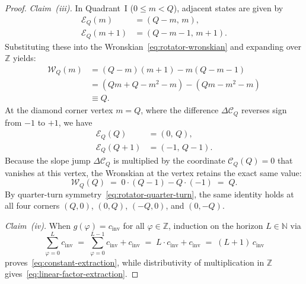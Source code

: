\documentclass[11pt,a4paper]{article}
\theoremstyle{plain}
\theoremstyle{definition}
\begin{document}
\begin{proof}
\emph{Claim~(iii).} In Quadrant~I ($0 \le m < Q$), adjacent states are given by
\begin{align*}
  \mathcal{E}_Q(m) &= (Q - m,\, m), \\
  \mathcal{E}_Q(m + 1) &= (Q - m - 1,\, m + 1).
\end{align*}
Substituting these into the Wronskian~\eqref{eq:rotator-wronskian} and expanding over $\mathbb{Z}$ yields:
\begin{align*}
  \mathcal{W}_Q(m) &= (Q - m)(m + 1) - m(Q - m - 1) \\
  &= (Qm + Q - m^2 - m) - (Qm - m^2 - m) \\
  &\equiv Q.
\end{align*}
At the diamond corner vertex $m = Q$, where the difference $\Delta\mathcal{C}_Q$ reverses sign from $-1$ to $+1$, we have
\begin{align*}
  \mathcal{E}_Q(Q) &= (0,\, Q), \\
  \mathcal{E}_Q(Q + 1) &= (-1,\, Q - 1).
\end{align*}
Because the slope jump $\Delta\mathcal{C}_Q$ is multiplied by the coordinate $\mathcal{C}_Q(Q) = 0$ that vanishes at this vertex, the Wronskian at the vertex retains the exact same value:
\begin{equation*}
  \mathcal{W}_Q(Q) \;=\; 0\cdot(Q - 1) - Q\cdot(-1) \;=\; Q.
\end{equation*}
By quarter-turn symmetry~\eqref{eq:rotator-quarter-turn}, the same identity holds at all four corners $(Q,0)$, $(0,Q)$, $(-Q,0)$, and $(0,-Q)$.

\emph{Claim~(iv).} When $g(\varphi) = c_{\mathrm{inv}}$ for all $\varphi \in \mathbb{Z}$, induction on the horizon $L \in \mathbb{N}$ via
\begin{equation*}
  \sum_{\varphi=0}^{L} c_{\mathrm{inv}} \;=\; \sum_{\varphi=0}^{L-1} c_{\mathrm{inv}} + c_{\mathrm{inv}} \;=\; L\cdot c_{\mathrm{inv}} + c_{\mathrm{inv}} \;=\; (L + 1)\,c_{\mathrm{inv}}
\end{equation*}
proves~\eqref{eq:constant-extraction}, while distributivity of multiplication in $\mathbb{Z}$ gives~\eqref{eq:linear-factor-extraction}.
\end{proof}
\end{document}
